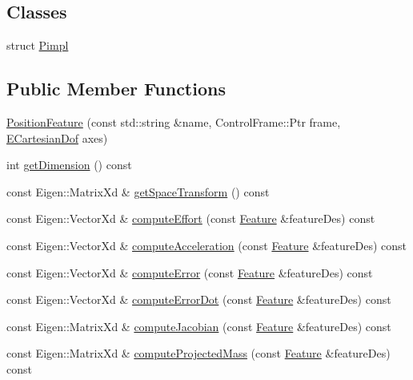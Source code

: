 \subsection*{Classes}
\begin{DoxyCompactItemize}
\item 
struct \hyperlink{structocra_1_1PositionFeature_1_1Pimpl}{Pimpl}
\end{DoxyCompactItemize}
\subsection*{Public Member Functions}
\begin{DoxyCompactItemize}
\item 
\hyperlink{classocra_1_1PositionFeature_abe283f029de484ca1eed44a1f9212f2f}{Position\+Feature} (const std\+::string \&name, Control\+Frame\+::\+Ptr frame, \hyperlink{namespaceocra_a436781c7059a0f76027df1c652126260}{E\+Cartesian\+Dof} axes)
\item 
int \hyperlink{classocra_1_1PositionFeature_a1fa18a892139ae4e962f189cedd699c0}{get\+Dimension} () const
\item 
const Eigen\+::\+Matrix\+Xd \& \hyperlink{classocra_1_1PositionFeature_a5ac98c0865a46c55d30fd7ab9738245c}{get\+Space\+Transform} () const
\item 
const Eigen\+::\+Vector\+Xd \& \hyperlink{classocra_1_1PositionFeature_a9cb07e0db4d84c5faa228676712e9120}{compute\+Effort} (const \hyperlink{classocra_1_1Feature}{Feature} \&feature\+Des) const
\item 
const Eigen\+::\+Vector\+Xd \& \hyperlink{classocra_1_1PositionFeature_aeff255bf903c24bd898b3d0e4fd9a14c}{compute\+Acceleration} (const \hyperlink{classocra_1_1Feature}{Feature} \&feature\+Des) const
\item 
const Eigen\+::\+Vector\+Xd \& \hyperlink{classocra_1_1PositionFeature_af347aeca5c5f531f8cae97311515814e}{compute\+Error} (const \hyperlink{classocra_1_1Feature}{Feature} \&feature\+Des) const
\item 
const Eigen\+::\+Vector\+Xd \& \hyperlink{classocra_1_1PositionFeature_a76887c9a378e9527e0afe6afad1e782b}{compute\+Error\+Dot} (const \hyperlink{classocra_1_1Feature}{Feature} \&feature\+Des) const
\item 
const Eigen\+::\+Matrix\+Xd \& \hyperlink{classocra_1_1PositionFeature_a9e609b86dcc917313b34853547738ca5}{compute\+Jacobian} (const \hyperlink{classocra_1_1Feature}{Feature} \&feature\+Des) const
\item 
const Eigen\+::\+Matrix\+Xd \& \hyperlink{classocra_1_1PositionFeature_a093701bd80310d92ea3d3f81c9ea629a}{compute\+Projected\+Mass} (const \hyperlink{classocra_1_1Feature}{Feature} \&feature\+Des) const

\end{DoxyCompactItemize}
